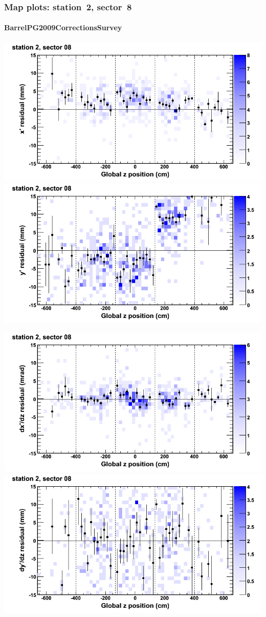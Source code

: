 \documentclass[compress]{beamer}
\begin{document}
\begin{frame}
\frametitle{Map plots: station~2, sector~8}
\framesubtitle{BarrelPG2009CorrectionsSurvey}
\includegraphics[width=0.5\linewidth]{mapplots_01/DTvsz_st2sec08_x.png}
\includegraphics[width=0.5\linewidth]{mapplots_01/DTvsz_st2sec08_y.png}

\includegraphics[width=0.5\linewidth]{mapplots_01/DTvsz_st2sec08_dxdz.png}
\includegraphics[width=0.5\linewidth]{mapplots_01/DTvsz_st2sec08_dydz.png}
\end{frame}
\end{document}
